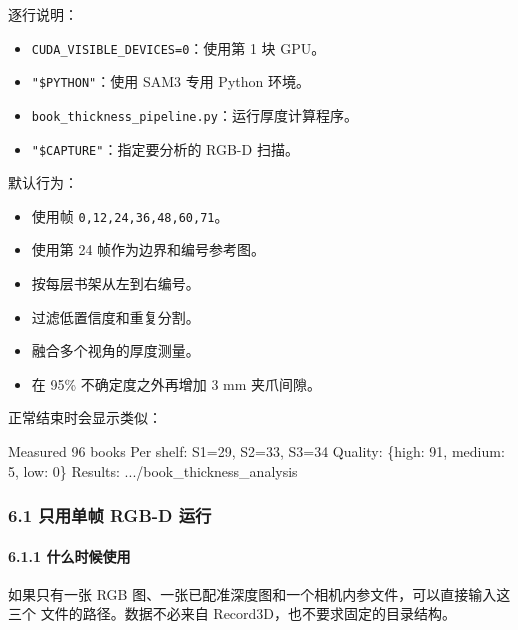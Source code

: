 \documentclass[
  chinese,
  11pt,
  a4paper,
]{article}
\newenvironment{Shaded}{\begin{snugshade}}{\end{snugshade}}
\newcommand{\NormalTok}[1]{#1}
\providecommand{\tightlist}{%
  \setlength{\itemsep}{0pt}\setlength{\parskip}{0pt}}
\begin{document}
逐行说明：

\begin{itemize}
\tightlist
\item
  \texttt{CUDA\_VISIBLE\_DEVICES=0}：使用第 1 块 GPU。
\item
  \texttt{"\$PYTHON"}：使用 SAM3 专用 Python 环境。
\item
  \texttt{book\_thickness\_pipeline.py}：运行厚度计算程序。
\item
  \texttt{"\$CAPTURE"}：指定要分析的 RGB-D 扫描。
\end{itemize}

默认行为：

\begin{itemize}
\tightlist
\item
  使用帧 \texttt{0,12,24,36,48,60,71}。
\item
  使用第 24 帧作为边界和编号参考图。
\item
  按每层书架从左到右编号。
\item
  过滤低置信度和重复分割。
\item
  融合多个视角的厚度测量。
\item
  在 95\% 不确定度之外再增加 3 mm 夹爪间隙。
\end{itemize}

正常结束时会显示类似：

\begin{Shaded}
\begin{Highlighting}[]
\NormalTok{Measured 96 books}
\NormalTok{Per shelf: S1=29, S2=33, S3=34}
\NormalTok{Quality: \{\textquotesingle{}high\textquotesingle{}: 91, \textquotesingle{}medium\textquotesingle{}: 5, \textquotesingle{}low\textquotesingle{}: 0\}}
\NormalTok{Results: .../book\_thickness\_analysis}
\end{Highlighting}
\end{Shaded}

\subsubsection{6.1 只用单帧 RGB-D
运行}\label{61-ux53eaux7528ux5355ux5e27-rgb-d-ux8fd0ux884c}

\paragraph{6.1.1
什么时候使用}\label{611-ux4ec0ux4e48ux65f6ux5019ux4f7fux7528}

如果只有一张 RGB
图、一张已配准深度图和一个相机内参文件，可以直接输入这三个
文件的路径。数据不必来自 Record3D，也不要求固定的目录结构。
\end{document}
